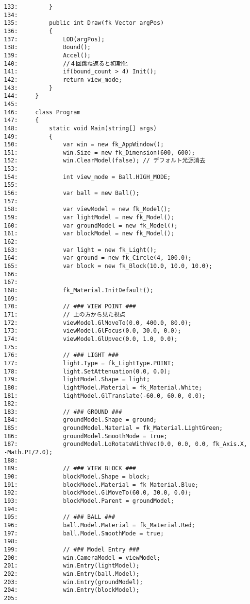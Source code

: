 \begin{breakbox}
\begin{small}
\begin{verbatim}
133:         }
134: 
135:         public int Draw(fk_Vector argPos)
136:         {
137:             LOD(argPos);
138:             Bound();
139:             Accel();
140:             //４回跳ね返ると初期化
141:             if(bound_count > 4) Init();
142:             return view_mode;
143:         }
144:     }
145: 
146:     class Program
147:     {
148:         static void Main(string[] args)
149:         {
150:             var win = new fk_AppWindow();
151:             win.Size = new fk_Dimension(600, 600);
152:             win.ClearModel(false); // デフォルト光源消去
153: 
154:             int view_mode = Ball.HIGH_MODE;
155:     
156:             var ball = new Ball();
157:             
158:             var viewModel = new fk_Model();
159:             var lightModel = new fk_Model();
160:             var groundModel = new fk_Model();
161:             var blockModel = new fk_Model();
162: 
163:             var light = new fk_Light();
164:             var ground = new fk_Circle(4, 100.0);
165:             var block = new fk_Block(10.0, 10.0, 10.0);
166: 
167: 
168:             fk_Material.InitDefault();
169: 
170:             // ### VIEW POINT ###
171:             // 上の方から見た視点
172:             viewModel.GlMoveTo(0.0, 400.0, 80.0);
173:             viewModel.GlFocus(0.0, 30.0, 0.0);
174:             viewModel.GlUpvec(0.0, 1.0, 0.0);
175: 
176:             // ### LIGHT ###
177:             light.Type = fk_LightType.POINT;
178:             light.SetAttenuation(0.0, 0.0);
179:             lightModel.Shape = light;
180:             lightModel.Material = fk_Material.White;
181:             lightModel.GlTranslate(-60.0, 60.0, 0.0);
182: 
183:             // ### GROUND ###
184:             groundModel.Shape = ground;
185:             groundModel.Material = fk_Material.LightGreen;
186:             groundModel.SmoothMode = true;
187:             groundModel.LoRotateWithVec(0.0, 0.0, 0.0, fk_Axis.X, -Math.PI/2.0);
188: 
189:             // ### VIEW BLOCK ###
190:             blockModel.Shape = block;
191:             blockModel.Material = fk_Material.Blue;
192:             blockModel.GlMoveTo(60.0, 30.0, 0.0);
193:             blockModel.Parent = groundModel;
194: 
195:             // ### BALL ###
196:             ball.Model.Material = fk_Material.Red;
197:             ball.Model.SmoothMode = true;
198:     
199:             // ### Model Entry ###
200:             win.CameraModel = viewModel;
201:             win.Entry(lightModel);
202:             win.Entry(ball.Model);
203:             win.Entry(groundModel);
204:             win.Entry(blockModel); 
205: 

\end{verbatim}
\end{small}
\end{breakbox}
